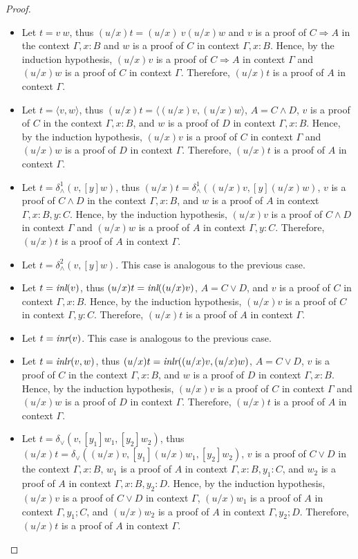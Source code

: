 \documentclass[screen, sigconf,authorversion,nonacm]{acmart}
\theoremstyle{acmdefinition}
\numberwithin{equation}{section}
\newcommand\abstr[1]{[#1]}
\newcommand\inl{\mbox{\it inl}}
\newcommand\inr{\mbox{\it inr}}
\newcommand\inlr{\mbox{\it inlr}}
\newcommand\elimand{\delta_{\wedge}}
\newcommand\elimor{\delta_{\vee}}
\newcommand\pair[2]{\langle #1, #2 \rangle}
\begin{document}
\begin{proof}
\begin{itemize}
      $(u/x)t$ is a proof of $A$ in context $\Gamma$.
    \item Let $t=v~w$,
      thus $(u/x)t=(u/x)~v(u/x)w$ and
      $v$ is a proof of $C\Rightarrow A$ in the context $\Gamma,x:B$ and $w$ is a proof of $C$ in context $\Gamma,x:B$. Hence, by the induction
      hypothesis,
      $(u/x)v$ is a proof of $C\Rightarrow A$ in context $\Gamma$ and
      $(u/x)w$ is a proof of $C$ in context $\Gamma$. Therefore, 
      $(u/x)t$ is a proof of $A$ in context $\Gamma$.
    \item Let $t= \pair{v}{w}$,
      thus $(u/x)t=\pair{(u/x)v}{(u/x)w}$, $A=C\wedge D$, 
      $v$ is a proof of $C$ in the context $\Gamma,x:B$, 
      and $w$ is a proof of $D$ in context $\Gamma,x:B$. Hence, by the
      induction hypothesis,
      $(u/x)v$ is a proof of $C$ in context $\Gamma$ and
      $(u/x)w$ is a proof of $D$ in context $\Gamma$. Therefore, 
      $(u/x)t$ is a proof of $A$ in context $\Gamma$.
    \item Let $t= \elimand^1(v,\abstr{y}w)$,
      thus $(u/x)t=\elimand^1((u/x)v,\abstr{y}{(u/x)w})$,
      $v$ is a proof of $C\wedge D$ in the context $\Gamma,x:B$, 
      and $w$ is a proof of $A$ in context $\Gamma,x:B,y:C$. Hence, by the
      induction hypothesis,
      $(u/x)v$ is a proof of $C\wedge D$ in context $\Gamma$ and
      $(u/x)w$ is a proof of $A$ in context $\Gamma,y:C$. Therefore, 
      $(u/x)t$ is a proof of $A$ in context $\Gamma$.
    \item Let $t= \elimand^2(v,\abstr{y}w)$. This case is  analogous to the previous case.
    \item Let $t= \inl(v)$,
      thus $(u/x)t=\inl((u/x)v)$, $A=C\vee D$, and
      $v$ is a proof of $C$ in context $\Gamma,x:B$.
      Hence, by the induction hypothesis,
      $(u/x)v$ is a proof of $C$ in context $\Gamma,y:C$. Therefore,
      $(u/x)t$ is a proof of $A$ in context $\Gamma$.
    \item Let $t= \inr(v)$. This case is  analogous to the previous case.
    \item Let $t= \inlr(v,w)$,
      thus $(u/x)t=\inlr({(u/x)v},{(u/x)w})$, $A=C\vee D$, 
      $v$ is a proof of $C$ in the context $\Gamma,x:B$, 
      and $w$ is a proof of $D$ in context $\Gamma,x:B$. Hence, by the
      induction hypothesis,
      $(u/x)v$ is a proof of $C$ in context $\Gamma$ and
      $(u/x)w$ is a proof of $D$ in context $\Gamma$. Therefore, 
      $(u/x)t$ is a proof of $A$ in context $\Gamma$.
    \item Let $t= \elimor(v,\abstr{y_1}w_1,\abstr{y_2}w_2)$,
      thus $(u/x)t=\elimor({(u/x)v},\abstr{y_1}{(u/x)w_1},\abstr{y_2}w_2)$, 
      $v$ is a proof of $C\vee D$ in the context $\Gamma,x:B$, 
      $w_1$ is a proof of $A$ in context $\Gamma,x:B,y_1:C$, and
      $w_2$ is a proof of $A$ in context $\Gamma,x:B,y_2:D$.
      Hence, by the induction hypothesis,
      $(u/x)v$ is a proof of $C\vee D$ in context $\Gamma$,
      $(u/x)w_1$ is a proof of $A$ in context $\Gamma,y_1;C$, and
      $(u/x)w_2$ is a proof of $A$ in context $\Gamma,y_2;D$.
      Therefore, $(u/x)t$ is a proof of $A$ in context $\Gamma$.
      \qedhere
  \end{itemize}
\end{proof}
\end{document}
